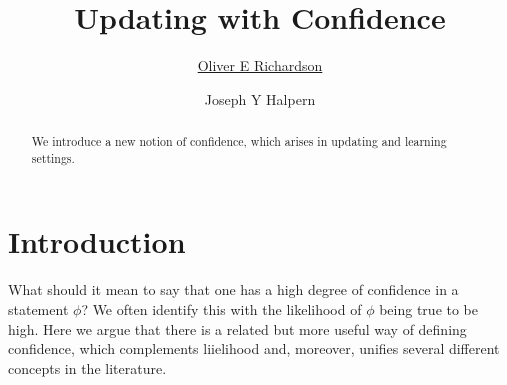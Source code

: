 \documentclass{uai2023} %
\title{%
    Updating with Confidence
}
\author[1]{\href{mailto:<oer5@cornell.edu>?Subject=confidence-paper}{Oliver E Richardson}{}}
\author[1]{Joseph Y Halpern}
\affil[1]{%
    Computer Science Dept.\\
    Cornell University\\
    Ithaca, New York, USA
}
\begin{document}
\maketitle

\begin{abstract}
    We introduce a new notion of confidence, which arises in updating and learning settings.
\end{abstract}

\section{Introduction}\label{sec:intro}
%
\def\stmt{$A$}

What should it mean to say that one has a high degree of confidence in
a statement $\phi$?  We often identify this with the
likelihood of $\phi$ being 
true to be high.  Here we argue that there is a related but
more useful way of defining confidence, which complements
liielihood and, moreover, unifies several different concepts in the
literature.  
\end{document}
